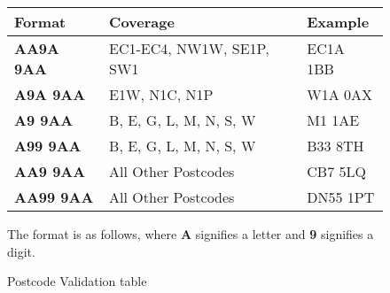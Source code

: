 \pagebreak


\begin{figure}[H]
\caption{Postcode Validation table} \label{fig: Postcode Validation table}
\begin{tabular}{|p{2cm}|p{3cm}|p{2cm}|}
        \hline
        \textbf{Format} & \textbf{Coverage} & \textbf{Example} \\ \hline
        \textbf{AA9A 9AA} & EC1-EC4, NW1W, SE1P, SW1 & EC1A 1BB \\ \hline
        \textbf{A9A 9AA} & E1W, N1C, N1P & W1A 0AX \\ \hline
        \textbf{A9 9AA} & B, E, G, L, M, N, S, W & M1 1AE \\ \hline
         \textbf{A99 9AA} & B, E, G, L, M, N, S, W & B33 8TH \\ \hline
         \textbf{AA9 9AA} & All Other Postcodes & CB7 5LQ \\ \hline
         \textbf{AA99 9AA} & All Other Postcodes & DN55 1PT \\ \hline
  \end{tabular}
\par
\par
  The format is as follows, where \textbf{A} signifies a letter and \textbf{9} signifies a digit.
\end{figure}



